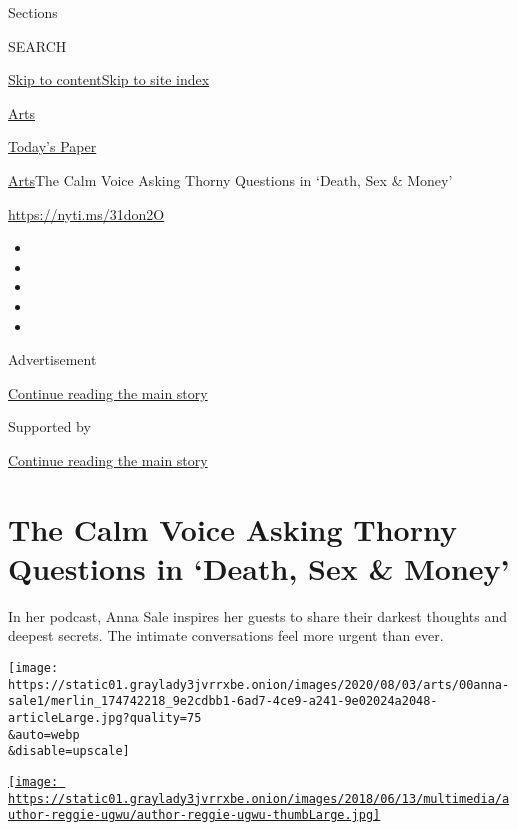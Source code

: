 Sections

SEARCH

\protect\hyperlink{site-content}{Skip to
content}\protect\hyperlink{site-index}{Skip to site index}

\href{https://www.nytimes3xbfgragh.onion/section/arts}{Arts}

\href{https://myaccount.nytimes3xbfgragh.onion/auth/login?response_type=cookie\&client_id=vi}{}

\href{https://www.nytimes3xbfgragh.onion/section/todayspaper}{Today's
Paper}

\href{/section/arts}{Arts}\textbar{}The Calm Voice Asking Thorny
Questions in `Death, Sex \& Money'

\url{https://nyti.ms/31don2O}

\begin{itemize}
\item
\item
\item
\item
\item
\end{itemize}

Advertisement

\protect\hyperlink{after-top}{Continue reading the main story}

Supported by

\protect\hyperlink{after-sponsor}{Continue reading the main story}

\hypertarget{the-calm-voice-asking-thorny-questions-in-death-sex--money}{%
\section{The Calm Voice Asking Thorny Questions in `Death, Sex \&
Money'}\label{the-calm-voice-asking-thorny-questions-in-death-sex--money}}

In her podcast, Anna Sale inspires her guests to share their darkest
thoughts and deepest secrets. The intimate conversations feel more
urgent than ever.

\texttt{[image: https://static01.graylady3jvrrxbe.onion/images/2020/08/03/arts/00anna-sale1/merlin\_174742218\_9e2cdbb1-6ad7-4ce9-a241-9e02024a2048-articleLarge.jpg?quality=75\\\&auto=webp\\\&disable=upscale]}

\href{https://www.nytimes3xbfgragh.onion/by/reggie-ugwu}{\texttt{[image: https://static01.graylady3jvrrxbe.onion/images/2018/06/13/multimedia/author-reggie-ugwu/author-reggie-ugwu-thumbLarge.jpg]}}

